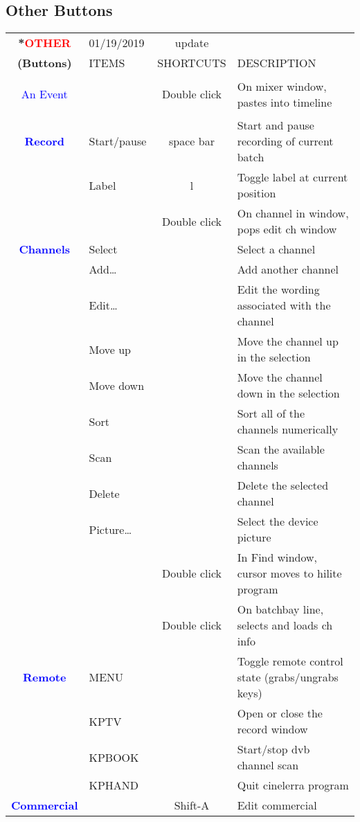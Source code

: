 \subsection{Other Buttons }%
\label{ssec:other_buttons}

\begin{center}
    \small 
    \begin{longtable}{ >{\bfseries}c l c p{6cm}}             
        \toprule
        \multirow{2}*{\textcolor{red}{OTHER}} & 01/19/2019 & update & \\
        \noalign{\smallskip}
        \cline{2-4}
        \noalign{\smallskip}
        (Buttons) & ITEMS & SHORTCUTS & DESCRIPTION\\
        \midrule        
        \endhead   
        
        \textcolor{blue}{An Event} &  & Double click & On mixer window, pastes into timeline \\
        \midrule
        \textcolor{blue}{Record} & Start/pause & space bar & Start and pause recording of current batch \\        
        & Label & l & Toggle label at current position \\        
        &  & Double click & On channel in window, pops edit ch window \\
        \midrule
        \textcolor{blue}{Channels} & Select &  & Select a channel \\        
        & Add\dots &  & Add another channel \\        
        & Edit\dots &  & Edit the wording associated with the channel \\        
        & Move up &  & Move the channel up in the selection \\        
        & Move down &  & Move the channel down in the selection \\        
        & Sort &  & Sort all of the channels numerically \\        
        & Scan &  & Scan the available channels \\        
        & Delete &  & Delete the selected channel \\        
        & Picture\dots &  & Select the device picture \\        
        &  & Double click & In Find window, cursor moves to hilite program \\        
        &  & Double click & On batchbay line, selects and loads ch info \\
        \midrule
        \textcolor{blue}{Remote} & MENU &  & Toggle remote control state (grabs/ungrabs keys) \\        
        & KPTV &  & Open or close the record window \\        
        & KPBOOK &  & Start/stop dvb channel scan \\        
        & KPHAND &  & Quit cinelerra program \\
        \midrule
        \textcolor{blue}{Commercial} &  & Shift-A & Edit commercial\\        
                
        \bottomrule  
    \end{longtable}
\end{center}
